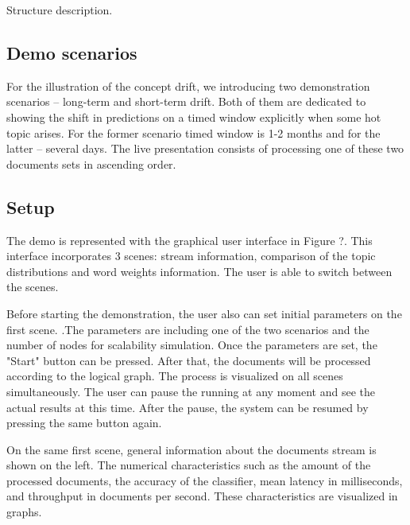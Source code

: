 
Structure description.

\subsection{Demo scenarios}

For the illustration of the concept drift, we introducing two demonstration scenarios -- long-term and short-term drift. Both of them are dedicated to showing the shift in predictions on a timed window explicitly when some hot topic arises. For the former scenario timed window is 1-2 months and for the latter -- several days. The live presentation consists of processing one of these two documents sets in ascending order. 


\subsection{Setup}

The demo is represented with the graphical user interface in Figure ?. This interface incorporates 3 scenes: stream information, comparison of the topic distributions and word weights information. The user is able to switch between the scenes. 

Before starting the demonstration, the user also can set initial parameters on the first scene. .The parameters are including one of the two scenarios and the number of nodes for scalability simulation. Once the parameters are set, the "Start" button can be pressed. After that, the documents will be processed according to the logical graph. The process is visualized on all scenes simultaneously. The user can pause the running at any moment and see the actual results at this time. After the pause, the system can be resumed by pressing the same button again.

On the same first scene, general information about the documents stream is shown on the left. The numerical characteristics such as the amount of the processed documents, the accuracy of the classifier, mean latency in milliseconds, and throughput in documents per second. These characteristics are visualized in graphs.

